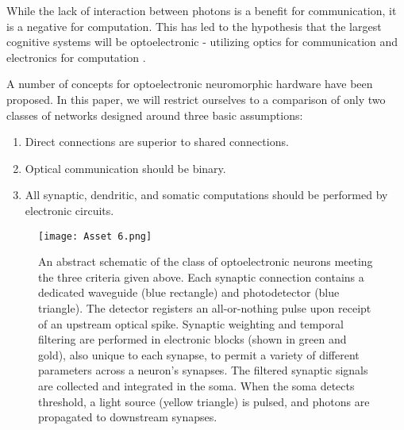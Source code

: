 \documentclass[twocolumn]{article}
\begin{document}
While the lack of interaction between photons is a benefit for communication, it is a negative for computation. This has led to the hypothesis that the largest cognitive systems will be optoelectronic - utilizing optics for communication and electronics for computation \cite{shainline2018largest}.

A number of concepts for optoelectronic neuromorphic hardware have been proposed. In this paper, we will restrict ourselves to a comparison of only two classes of networks designed around three basic assumptions:

\begin{enumerate}
    \item Direct connections are superior to shared connections.
    \item Optical communication should be binary.
    \item All synaptic, dendritic, and somatic computations should be performed by electronic circuits.
\end{enumerate}

\begin{figure*}
    \centering
    \texttt{[image: Asset 6.png]}
    \caption{An abstract schematic of the class of optoelectronic neurons meeting the three criteria given above. Each synaptic connection contains a dedicated waveguide (blue rectangle) and photodetector (blue triangle). The detector registers an all-or-nothing pulse upon receipt of an upstream optical spike. Synaptic weighting and temporal filtering are performed in electronic blocks (shown in green and gold), also unique to each synapse, to permit a variety of different parameters across a neuron's synapses. The filtered synaptic signals are collected and integrated in the soma. When the soma detects threshold, a light source (yellow triangle) is pulsed, and photons are propagated to downstream synapses.}
    \label{fig:Schematic}
\end{figure*}
\end{document}
